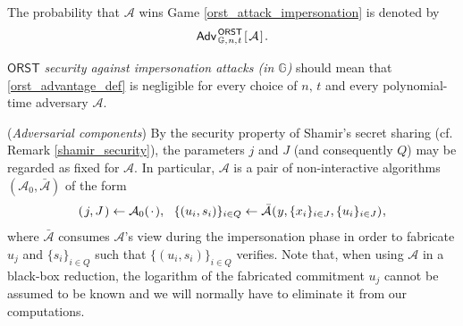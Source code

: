 \documentclass{iacrtrans}
\begin{document}
\noindent
The probability that  $\mathcal{A}$ wins
Game \ref{orst_attack_impersonation}
is denoted by
\vspace{5pt}
\begin{equation}\label{orst_advantage_def}
\mathsf{Adv}
	_{\hspace{1pt}\mathbb{G},\hspace{0.5pt} n,\hspace{0.5pt} t}
	^{\hspace{1pt}\mathsf{ORST}}
	\hspace{1pt}
		[\hspace{1pt}
			\mathcal{A}
		\hspace{1pt}]\hspace{1pt}.
\vspace{5pt}
\end{equation}

\noindent
$\mathsf{ORST}$ \textit{security against impersonation attacks
\textup{(\textit{in} $\mathbb{G}$)}}
should mean that \eqref{orst_advantage_def}
is negligible for every choice of $n,\hspace{2pt} t$
and every polynomial-time adversary $\mathcal{A}$.

\begin{rem}\label{rem_adversarial_components}
(\textit{Adversarial components})
By the security property of
Shamir's secret sharing (cf. Remark \ref{shamir_security}),
the parameters $j$ and $J$ (and consequently $Q$)
may be regarded as fixed for $\mathcal{A}$.
In particular, $\mathcal{A}$ is
a pair of non-interactive algorithms
$(\mathcal{A}_0, \mathcal{\bar{A}})$
of the form
\vspace{5pt}
\begin{equation*}\label{adversary_internal}
(\hspace{1pt}j, J\hspace{1pt})
\leftarrow
\mathcal{A}_0(\hspace{1pt}\cdot\hspace{1pt}),\ \ \{(u_i, s_i)\}_{i \in Q} \leftarrow
\mathcal{\bar{A}}\hspace{0.5pt}
	(
		\hspace{0.5pt}
		y,
		\{x_i\}_{i \in J},
		\{u_i\}_{i \in J}
	)
\hspace{0.5pt},
\vspace{5pt}
\end{equation*}
where $\mathcal{\bar{A}}$ consumes $\mathcal{A}$'s view
during the impersonation phase
in order to fabricate $u_j$ and
$\{s_i\}_{i \in Q}$ such that
$\{(u_i, s_i)\}_{i \in Q}$ verifies.
Note that, when using $\mathcal{A}$
in a black-box reduction,
the logarithm of the fabricated commitment $u_j$
cannot be assumed to be known
and we will normally have to
eliminate it from our computations.
\end{rem}
\end{document}
